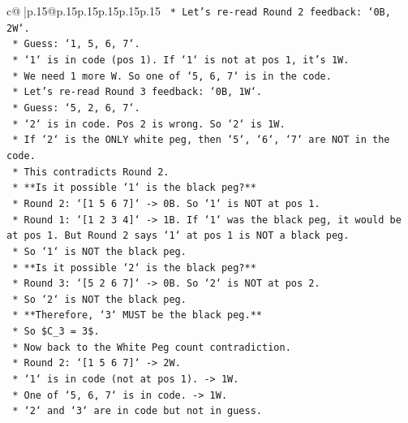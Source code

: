 \documentclass{article}
\begin{document}
{\begin{supertabular}{c@{$\;$}|p{.15\linewidth}@{}p{.15\linewidth}p{.15\linewidth}p{.15\linewidth}p{.15\linewidth}p{.15\linewidth}}
{{{\texttt{            *   Let's re{-}read Round 2 feedback: `0B, 2W`.} \\
\texttt{                *   Guess: `1, 5, 6, 7`.} \\
\texttt{                *   `1` is in code (pos 1). If `1` is not at pos 1, it's 1W.} \\
\texttt{                *   We need 1 more W. So one of `5, 6, 7` is in the code.} \\
\texttt{            *   Let's re{-}read Round 3 feedback: `0B, 1W`.} \\
\texttt{                *   Guess: `5, 2, 6, 7`.} \\
\texttt{                *   `2` is in code. Pos 2 is wrong. So `2` is 1W.} \\
\texttt{                *   If `2` is the ONLY white peg, then `5`, `6`, `7` are NOT in the code.} \\
\texttt{                *   This contradicts Round 2.} \\
\texttt{            *   **Is it possible `1` is the black peg?**} \\
\texttt{                *   Round 2: `{[}1 5 6 7{]}` {-}> 0B. So `1` is NOT at pos 1.} \\
\texttt{                *   Round 1: `{[}1 2 3 4{]}` {-}> 1B. If `1` was the black peg, it would be at pos 1. But Round 2 says `1` at pos 1 is NOT a black peg.} \\
\texttt{                *   So `1` is NOT the black peg.} \\
\texttt{            *   **Is it possible `2` is the black peg?**} \\
\texttt{                *   Round 3: `{[}5 2 6 7{]}` {-}> 0B. So `2` is NOT at pos 2.} \\
\texttt{                *   So `2` is NOT the black peg.} \\
\texttt{            *   **Therefore, `3` MUST be the black peg.**} \\
\texttt{                *   So \$C\_3 = 3\$.} \\
\texttt{            *   Now back to the White Peg count contradiction.} \\
\texttt{                *   Round 2: `{[}1 5 6 7{]}` {-}> 2W.} \\
\texttt{                    *   `1` is in code (not at pos 1). {-}> 1W.} \\
\texttt{                    *   One of `5, 6, 7` is in code. {-}> 1W.} \\
\texttt{                    *   `2` and `3` are in code but not in guess.} \\
}}}
\end{supertabular}}
\end{document}
